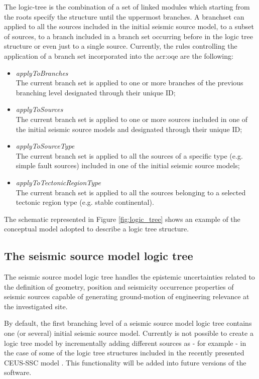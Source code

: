 The logic-tree is the combination of a set of linked modules which 
starting from the roots specify the structure until the uppermost 
branches. 
%
A \gls{branchset} can applied to all the sources included in the initial 
seismic source model, to a subset of sources, to a branch included in a 
branch set occurring before in the logic tree structure or even just to 
a single source. 
%
Currently, the rules controlling the application of a branch set 
incorporated into the \gls{acr:oqe} are the following:
\begin{itemize}
    \item \emph{applyToBranches} \hfill \\
        The current branch set is applied to one or more branches 
        of the previous branching level designated through their 
        unique ID;
    \item \emph{applyToSources} \hfill \\
        The current branch set is applied to one or more sources 
        included in one of the initial seismic source models and designated 
        through their unique ID;
    \item \emph{applyToSourceType} \hfill \\
        The current branch set is applied to all the sources of a 
        specific type (e.g. simple fault sources) included in one of the 
        initial seismic source models;
    \item \emph{applyToTectonicRegionType} \hfill \\
        The current branch set is applied to all the sources belonging 
        to a selected tectonic region type (e.g. stable continental).
\end{itemize}
%
The schematic represented in Figure \ref{fig:logic_tree} shows an example of 
the conceptual model adopted to describe a logic tree structure. 
%
\subsection{The seismic source model logic tree}
The seismic source model logic tree handles the epistemic uncertainties
related to the definition of geometry, position and seismicity occurrence 
properties of seismic sources capable of generating ground-motion of 
engineering relevance at the investigated site. 

By default, the first branching level of a seismic source model logic tree 
contains one (or several) initial seismic source model. 
%
Currently is not possible to create a logic tree model by 
incrementally adding different sources as - for example - in the case of 
some of the logic tree structures included in the recently presented 
CEUS-SSC model \parencite{ceus2012}. 
%
This functionality will be added into future versions of the software.
%
